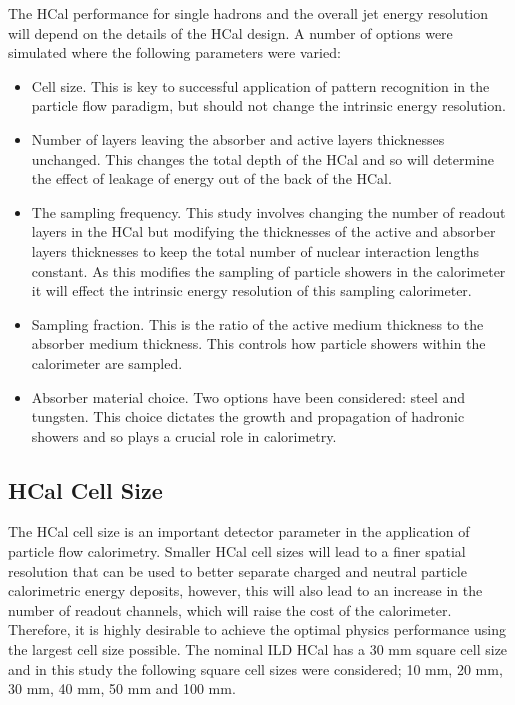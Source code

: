 
The HCal performance for single hadrons and the overall jet energy resolution will depend on the details of the HCal design.  A number of options were simulated where the following parameters were varied:
\begin{itemize}
\item Cell size.  This is key to successful application of pattern recognition in the particle flow paradigm, but should not change the intrinsic energy resolution.   
\item Number of layers leaving the absorber and active layers thicknesses unchanged.  This changes the total depth of the HCal and so will determine the effect of leakage of energy out of the back of the HCal.
\item The sampling frequency.  This study involves changing the number of readout layers in the HCal but modifying the thicknesses of the active and absorber layers thicknesses to keep the total number of nuclear interaction lengths constant.  As this modifies the sampling of particle showers in the calorimeter it will effect the intrinsic energy resolution of this sampling calorimeter.
\item Sampling fraction.  This is the ratio of the active medium thickness to the absorber medium thickness.  This controls how particle showers within the calorimeter are sampled.
\item Absorber material choice.  Two options have been considered: steel and tungsten.  This choice dictates the growth and propagation of hadronic showers and so plays a crucial role in calorimetry.  
\end{itemize}



\subsection{HCal Cell Size}
\label{sec:hcalcells}
The HCal cell size is an important detector parameter in the application of particle flow calorimetry.  Smaller HCal cell sizes will lead to a finer spatial resolution that can be used to better separate charged and neutral particle calorimetric energy deposits, however, this will also lead to an increase in the number of readout channels, which will raise the cost of the calorimeter.  Therefore, it is highly desirable to achieve the optimal physics performance using the largest cell size possible.  The nominal ILD HCal has a 30 mm square cell size and in this study the following square cell sizes were considered; 10 mm, 20 mm, 30 mm, 40 mm, 50 mm and 100 mm.  

